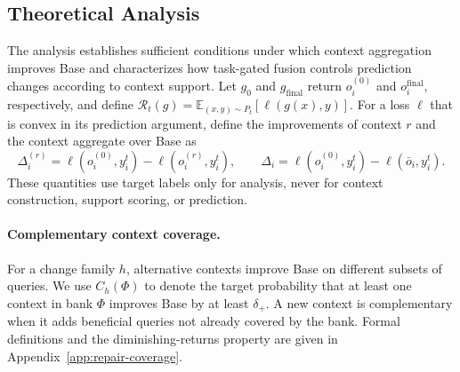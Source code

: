 \ifdefined\ICLRLayout\clearpage\fi
\subsection{Theoretical Analysis}
\label{sec:theory}

The analysis establishes sufficient conditions under which context aggregation
improves Base and characterizes how task-gated fusion controls prediction
changes according to context support. Let
$g_0$ and $g_{\mathrm{final}}$ return $o_i^{(0)}$ and
$o_i^{\mathrm{final}}$, respectively, and define
$\mathcal R_t(g)=\mathbb E_{(x,y)\sim P_t}[\ell(g(x),y)]$. For a loss $\ell$
that is convex in its prediction argument, define the improvements of context
$r$ and the context aggregate over Base as
\begin{equation}
  \Delta_i^{(r)}
  =\ell(o_i^{(0)},y_i^t)-\ell(o_i^{(r)},y_i^t),
  \qquad
  \Delta_i
  =\ell(o_i^{(0)},y_i^t)-\ell(\bar o_i,y_i^t).
  \label{eq:context_improvements}
\end{equation}
These quantities use target labels only for analysis, never for context
construction, support scoring, or prediction.

\paragraph{Complementary context coverage.}
For a change family $h$, alternative contexts improve Base on different
subsets of queries. We use $C_h(\Phi)$ to denote the target probability that
at least one context in bank $\Phi$ improves Base by at least $\delta_+$. A new
context is complementary when it adds beneficial queries not already covered
by the bank. Formal definitions and the
diminishing-returns property are given in Appendix~\ref{app:repair-coverage}.

